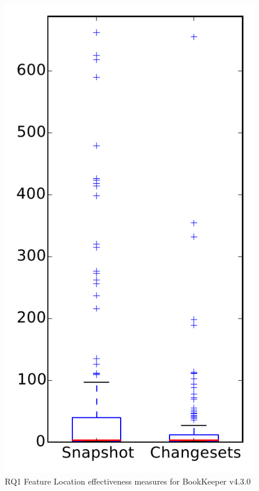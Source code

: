 
\begin{figure}
\centering
\includegraphics[height=0.4\textheight]{figures/flt/rq1_bookkeeper}
\caption{RQ1 Feature Location effectiveness measures for BookKeeper v4.3.0}
\label{fig:flt:rq1:bookkeeper}
\end{figure}
